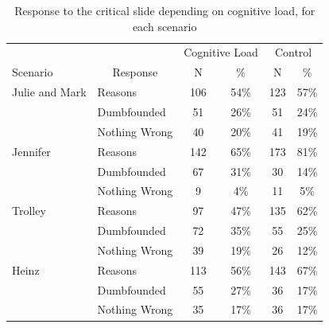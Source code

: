 \documentclass[
  american,
  man,floatsintext]{apa7}
\begin{document}
\begin{table}[tbp]

\begin{center}
\begin{threeparttable}

\caption{\label{tab:tabS6tab1dumb1allIncest}Response to the critical slide depending on cognitive load, for each scenario}

\begin{tabular}{llcccc}
\toprule
 &  & \multicolumn{2}{c}{Cognitive Load} & \multicolumn{2}{c}{Control} \\
\cmidrule(r){3-4} \cmidrule(r){5-6}
Scenario & \multicolumn{1}{c}{Response} & \multicolumn{1}{c}{N} & \multicolumn{1}{c}{\%} & \multicolumn{1}{c}{N} & \multicolumn{1}{c}{\%}\\
\midrule
Julie and Mark & Reasons & 106 & 54\% & 123 & 57\%\\
 & Dumbfounded & 51 & 26\% & 51 & 24\%\\
 & Nothing Wrong & 40 & 20\% & 41 & 19\%\\
Jennifer & Reasons & 142 & 65\% & 173 & 81\%\\
 & Dumbfounded & 67 & 31\% & 30 & 14\%\\
 & Nothing Wrong & 9 & 4\% & 11 & 5\%\\
Trolley & Reasons & 97 & 47\% & 135 & 62\%\\
 & Dumbfounded & 72 & 35\% & 55 & 25\%\\
 & Nothing Wrong & 39 & 19\% & 26 & 12\%\\
Heinz & Reasons & 113 & 56\% & 143 & 67\%\\
 & Dumbfounded & 55 & 27\% & 36 & 17\%\\
 & Nothing Wrong & 35 & 17\% & 36 & 17\%\\
\bottomrule
\end{tabular}

\end{threeparttable}
\end{center}

\end{table}
\end{document}

